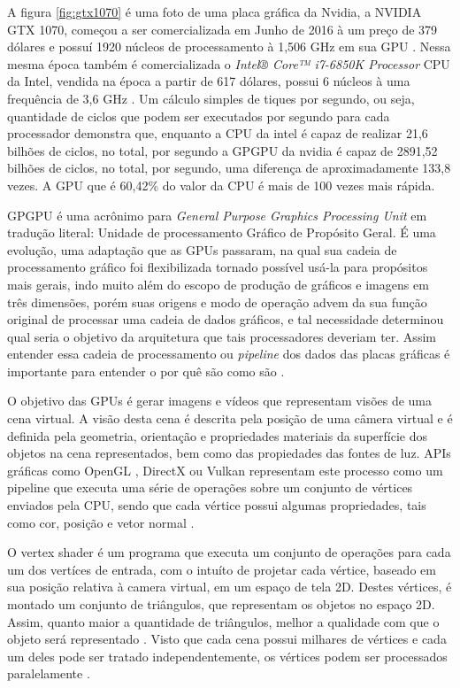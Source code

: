   A figura \ref{fig:gtx1070} é uma foto de uma placa gráfica da Nvidia, a NVIDIA GTX 1070, começou a ser comercializada em Junho de 2016 à um preço de 379 dólares e possuí 1920 núcleos de processamento à 1,506 GHz em sua GPU \citep{gtx1070:16}. Nessa mesma época também é comercializada o \textit{Intel® Core™ i7-6850K Processor} CPU da Intel, vendida na época a partir de 617 dólares, possui 6 núcleos à uma frequência de 3,6 GHz \citep{inteli7:16}. Um cálculo simples de tiques por segundo, ou seja, quantidade de ciclos que podem ser executados por segundo para cada processador demonstra que, enquanto a CPU da intel é capaz de realizar 21,6 bilhões de ciclos, no total, por segundo a GPGPU da nvidia é capaz de 2891,52 bilhões de ciclos, no total, por segundo, uma diferença de aproximadamente 133,8 vezes. A GPU que é 60,42\% do valor da CPU é mais de 100 vezes mais rápida.

  GPGPU é uma acrônimo para \textit{General Purpose Graphics Processing Unit} em tradução literal: Unidade de processamento Gráfico de Propósito Geral. É uma evolução, uma adaptação que as GPUs passaram, na qual sua cadeia de processamento gráfico foi flexibilizada tornado possível usá-la para propósitos mais gerais, indo muito além do escopo de produção de gráficos e imagens em três dimensões, porém suas origens e modo de operação advem da sua função original de processar uma cadeia de dados gráficos, e tal necessidade determinou qual seria o objetivo da arquitetura que tais processadores deveriam ter. Assim entender essa cadeia de processamento ou \textit{pipeline} dos dados das placas gráficas é importante para entender o por quê são como são \citep{massively:16}.

  O objetivo das GPUs é gerar imagens e vídeos que representam visões de uma cena virtual. A visão desta cena é descrita pela posição de uma câmera virtual e é definida pela geometria, orientação e propriedades materiais da superfície dos objetos na cena representados, bem como das propiedades das fontes de luz. APIs gráficas como OpenGL \citep{opengl}, DirectX \citep{directx} ou Vulkan\citep{vulkan} representam este processo como um pipeline que executa uma série de operações sobre um conjunto de vértices enviados pela CPU, sendo que cada vértice possui algumas propriedades, tais como cor, posição e vetor normal \citep{closer-look:08}.

  O vertex shader é um programa que executa um conjunto de operações para cada um dos vertíces de entrada, com o intuíto de projetar cada vértice, baseado em sua posição relativa à camera virtual, em um espaço de tela 2D. Destes vértices, é montado um conjunto de triângulos, que representam os objetos no espaço 2D. Assim, quanto maior a quantidade de triângulos, melhor a qualidade com que o objeto será representado \citep{closer-look:08}. Visto que cada cena  possui milhares de vértices e cada um deles pode ser tratado independentemente, os vértices podem ser processados paralelamente \citep{gpu-comp:08}.

